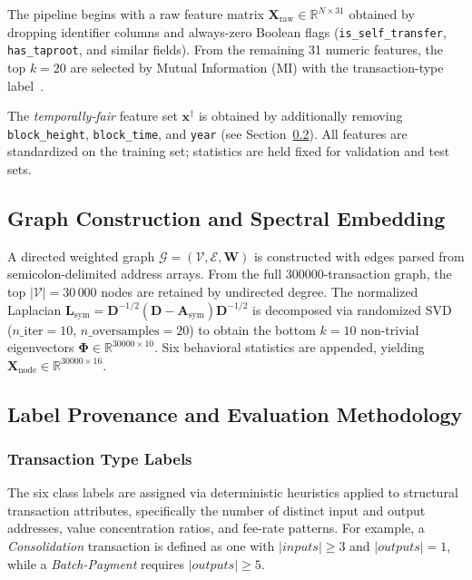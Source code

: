 \documentclass[journal]{IEEEtran}
\begin{document}
The pipeline begins with a raw feature matrix
$\mathbf{X}_{\text{raw}} \in \mathbb{R}^{N \times 31}$
obtained by dropping identifier columns and always-zero Boolean flags
(\texttt{is\_self\_transfer}, \texttt{has\_taproot}, and similar fields).
From the remaining 31 numeric features, the top $k = 20$ are selected by
Mutual Information (MI) with the transaction-type label~\cite{Kraskov2004}.

The \emph{temporally-fair} feature set $\mathbf{x}^{\dagger}$ is obtained by
additionally removing \texttt{block\_height}, \texttt{block\_time}, and
\texttt{year} (see Section~\ref{subsec:label_provenance}).  All features are
standardized on the training set; statistics are held fixed for validation and
test sets.

\subsection{Graph Construction and Spectral Embedding}
\label{subsec:graph_construction}

A directed weighted graph
$\mathcal{G} = (\mathcal{V}, \mathcal{E}, \mathbf{W})$
is constructed with edges parsed from semicolon-delimited address arrays.
From the full \num{300000}-transaction graph, the top
$|\mathcal{V}| = 30\,000$ nodes are retained by undirected degree.
The normalized Laplacian
$\mathbf{L}_{\text{sym}} = \mathbf{D}^{-1/2}(\mathbf{D} - \mathbf{A}_{\text{sym}})\mathbf{D}^{-1/2}$
is decomposed via randomized SVD~\cite{Halko2011} ($n\_\text{iter}=10$,
$n\_\text{oversamples}=20$) to obtain the bottom $k = 10$ non-trivial
eigenvectors $\boldsymbol{\Phi} \in \mathbb{R}^{30000 \times 10}$.
Six behavioral statistics are appended, yielding
$\mathbf{X}_{\text{node}} \in \mathbb{R}^{30000 \times 16}$.

\subsection{Label Provenance and Evaluation Methodology}
\label{subsec:label_provenance}
\label{sec:label_provenance}

\subsubsection{Transaction Type Labels}
The six class labels are assigned via deterministic heuristics applied to
structural transaction attributes, specifically the number of distinct input
and output addresses, value concentration ratios, and fee-rate patterns.
For example, a \emph{Consolidation} transaction is defined as one with
$|\mathit{inputs}| \geq 3$ and $|\mathit{outputs}| = 1$, while a
\emph{Batch-Payment} requires $|\mathit{outputs}| \geq 5$.
\end{document}

